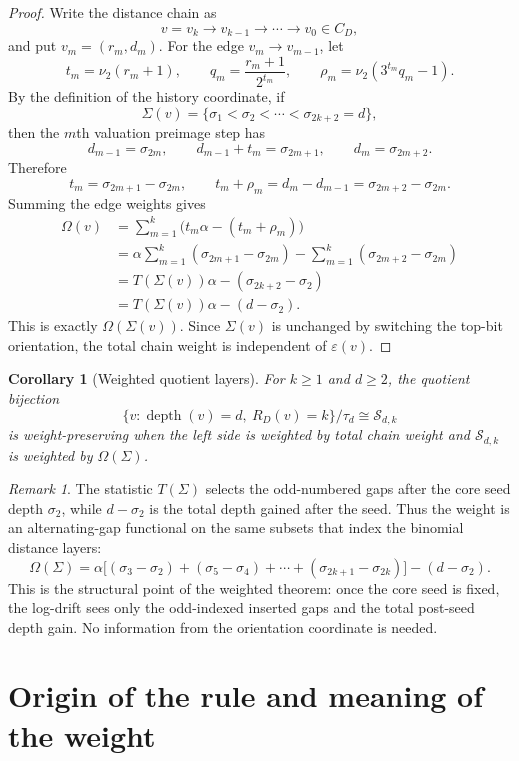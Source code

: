 \documentclass[11pt]{amsart}
\newtheorem{corollary}[theorem]{Corollary}
\theoremstyle{definition}
\theoremstyle{remark}
\newtheorem{remark}[theorem]{Remark}
\newcommand{\nuu}{\nu_2}
\newcommand{\depth}{\operatorname{depth}}
\newcommand{\Sfam}{\mathcal S}
\newcommand{\eps}{\varepsilon}
\begin{document}
\begin{proof}
Write the distance chain as
\[
v=v_k\to v_{k-1}\to\cdots\to v_0\in C_D,
\]
and put $v_m=(r_m,d_m)$.  For the edge $v_m\to v_{m-1}$, let
\[
t_m=\nuu(r_m+1),\qquad q_m=\frac{r_m+1}{2^{t_m}},\qquad \rho_m=\nuu(3^{t_m}q_m-1).
\]
By the definition of the history coordinate, if
\[
\Sigma(v)=\{\sigma_1<\sigma_2<\cdots<\sigma_{2k+2}=d\},
\]
then the $m$th valuation preimage step has
\[
d_{m-1}=\sigma_{2m},\qquad d_{m-1}+t_m=\sigma_{2m+1},\qquad d_m=\sigma_{2m+2}.
\]
Therefore
\[
t_m=\sigma_{2m+1}-\sigma_{2m},
\qquad
 t_m+\rho_m=d_m-d_{m-1}=\sigma_{2m+2}-\sigma_{2m}.
\]
Summing the edge weights gives
\begin{align*}
\Omega(v)
&=\sum_{m=1}^k\bigl(t_m\alpha-(t_m+\rho_m)\bigr)\\
&=\alpha\sum_{m=1}^k(\sigma_{2m+1}-\sigma_{2m})
  -\sum_{m=1}^k(\sigma_{2m+2}-\sigma_{2m})\\
&=T(\Sigma(v))\alpha-(\sigma_{2k+2}-\sigma_2)\\
&=T(\Sigma(v))\alpha-(d-\sigma_2).
\end{align*}
This is exactly $\Omega(\Sigma(v))$.  Since $\Sigma(v)$ is unchanged by switching the top-bit orientation, the total chain weight is independent of $\eps(v)$.
\end{proof}

\begin{corollary}[Weighted quotient layers]\label{cor:weightedquotient}
For $k\ge1$ and $d\ge2$, the quotient bijection
\[
\{v:\depth(v)=d,\ R_D(v)=k\}/\tau_d\cong\Sfam_{d,k}
\]
is weight-preserving when the left side is weighted by total chain weight and $\Sfam_{d,k}$ is weighted by $\Omega(\Sigma)$.
\end{corollary}

\begin{remark}
The statistic $T(\Sigma)$ selects the odd-numbered gaps after the core seed depth $\sigma_2$, while $d-\sigma_2$ is the total depth gained after the seed.  Thus the weight is an alternating-gap functional on the same subsets that index the binomial distance layers:
\[
\Omega(\Sigma)
=
\alpha\bigl[(\sigma_3-\sigma_2)+(\sigma_5-\sigma_4)+\cdots+(\sigma_{2k+1}-\sigma_{2k})\bigr]
-(d-\sigma_2).
\]
This is the structural point of the weighted theorem: once the core seed is fixed, the log-drift sees only the odd-indexed inserted gaps and the total post-seed depth gain.  No information from the orientation coordinate is needed.
\end{remark}

\section{Origin of the rule and meaning of the weight}\label{sec:collatz}
\end{document}
